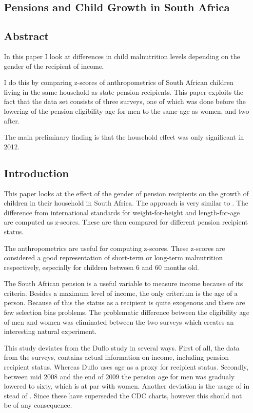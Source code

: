 \begin{refsection}
\chapter{Pensions and Child Growth in South Africa}
\label{sa}
\section*{Abstract}
In this paper I look at differences in child malnutrition levels depending on the gender of the recipient of income.

I do this by comparing z-scores of anthropometrics of South African children living in the same household as state pension recipients.
This paper exploits the fact that the data set consists of three surveys,
one of which was done before the lowering of the pension eligibility age for men to the same age as women,
and two after.

The main preliminary finding is that the household effect was only significant in 2012.

\section{Introduction}
\label{sa:intro}
This paper looks at the effect of the gender of pension recipients on the growth of children in their household in South Africa.
The approach is very similar to \textcite{duflo2000child,duflo2003grandmothers}.
The difference from international standards \parencite[WHO Child Growth Standards]{who2006child} for weight-for-height and length-for-age are computed as z-scores.
These are then compared for different pension recipient status.

The anthropometrics are useful for computing z-scores. These z-scores are considered a good representation of short-term or long-term malnutrition respectively, especially for children between 6 and 60 months old.

The South African pension is a useful variable to measure income because of its criteria.
Besides a maximum level of income, the only criterium is the age of a person.
Because of this the status as a recipient is quite exogenous and there are few selection bias problems.
The problematic difference between the eligibility age of men and women was eliminated between the two surveys which creates an interesting natural experiment.

This study deviates from the Duflo study in several ways.
First of all, the data from the \textcite{saldru2008nids,saldru2012nids} surveys, contains actual information on income,
including pension recipient status.
Whereas Duflo uses age as a proxy for recipient status.
Secondly, between mid 2008 and the end of 2009 the pension age for men was gradualy lowered to sixty, which is at par with women.
Another deviation is the usage of \textcite[WHO Child Growth Standards]{who2006child} in stead of \textcite[CDC Growth Charts: United States]{nchs2000cdc}.
Since these have superseded the CDC charts, however this should not be of any consequence.


\end{refsection}
